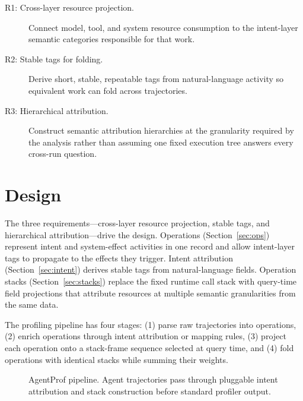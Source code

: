 \documentclass[letterpaper]{article}
\begin{document}
\begin{description}
\item[R1: Cross-layer resource projection.]
Connect model, tool, and system resource consumption to the intent-layer
semantic categories responsible for that work.
\item[R2: Stable tags for folding.]
Derive short, stable, repeatable tags from natural-language activity so
equivalent work can fold across trajectories.
\item[R3: Hierarchical attribution.]
Construct semantic attribution hierarchies at the granularity required by the
analysis rather than assuming one fixed execution tree answers every cross-run
question.
\end{description}

\section{Design}
\label{sec:design}

The three requirements---cross-layer resource projection, stable tags, and
hierarchical attribution---drive the design. Operations
(Section~\ref{sec:ops}) represent intent and system-effect activities in one
record and allow intent-layer tags to propagate to the effects they trigger.
Intent attribution (Section~\ref{sec:intent}) derives stable tags from
natural-language fields. Operation stacks (Section~\ref{sec:stacks}) replace
the fixed runtime call stack with query-time field projections that attribute
resources at multiple semantic granularities from the same data.

The profiling pipeline has four stages: (1) parse raw trajectories into
operations, (2) enrich operations through intent attribution or mapping rules,
(3) project each operation onto a stack-frame sequence selected at query time,
and (4) fold operations with identical stacks while summing their weights.

\begin{figure}[t]
\centering
\resizebox{\linewidth}{!}{}
\caption{AgentProf pipeline. Agent trajectories pass through pluggable intent
attribution and stack construction before standard profiler output.}
\label{fig:architecture}
\end{figure}
\end{document}
